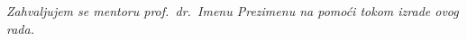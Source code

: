 \thispagestyle{empty}
\vspace*{\fill}
\begin{center}
	\itshape
	Zahvaljujem se mentoru prof.~dr.~Imenu Prezimenu na pomoći tokom izrade ovog rada.
\end{center}
\vspace*{\fill}
\cleardoublepage
